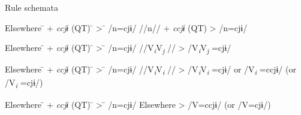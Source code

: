 \ea\label{ex:10.59}   Rule schemata\\
  \ea 
  \begin{tabbing}
  Elsewhere \hspace{\tabcolsep}\=\hspace{\tabcolsep} +  \textit{ccjɨ} (QT) \hspace{\tabcolsep}\=\hspace{\tabcolsep} > \hspace{\tabcolsep}\=\hspace{\tabcolsep} /n=cjɨ/\kill
  //n// \> + \textit{ccjɨ} (QT) \> > \> /n=cjɨ/
  \end{tabbing}
  \ex  \begin{tabbing}
  Elsewhere \hspace{\tabcolsep}\=\hspace{\tabcolsep} +  \textit{ccjɨ} (QT) \hspace{\tabcolsep}\=\hspace{\tabcolsep} > \hspace{\tabcolsep}\=\hspace{\tabcolsep} /n=cjɨ/\kill
  //V\textit{\textsubscript{i}}V\textit{\textsubscript{j} }//  \>   \> > \> /V\textit{\textsubscript{i}}V\textit{\textsubscript{j} }=cjɨ/
  \end{tabbing}
  \ex \begin{tabbing}
  Elsewhere \hspace{\tabcolsep}\=\hspace{\tabcolsep} +  \textit{ccjɨ} (QT) \hspace{\tabcolsep}\=\hspace{\tabcolsep} > \hspace{\tabcolsep}\=\hspace{\tabcolsep} /n=cjɨ/\kill
  //V\textit{\textsubscript{i}}V\textit{\textsubscript{i} }// \> \>     > \> /V\textit{\textsubscript{i}}V\textit{\textsubscript{i} }=cjɨ/ or /V\textit{\textsubscript{i} }=ccjɨ/ (or /V\textit{\textsubscript{i} }=cjɨ/)
  \end{tabbing}
  \ex \begin{tabbing}
  Elsewhere \hspace{\tabcolsep}\=\hspace{\tabcolsep} +  \textit{ccjɨ} (QT) \hspace{\tabcolsep}\=\hspace{\tabcolsep} > \hspace{\tabcolsep}\=\hspace{\tabcolsep} /n=cjɨ/\kill
  Elsewhere    \> \>  > \>  /V=ccjɨ/ (or /V=cjɨ/)
  \end{tabbing}
\z
\z

